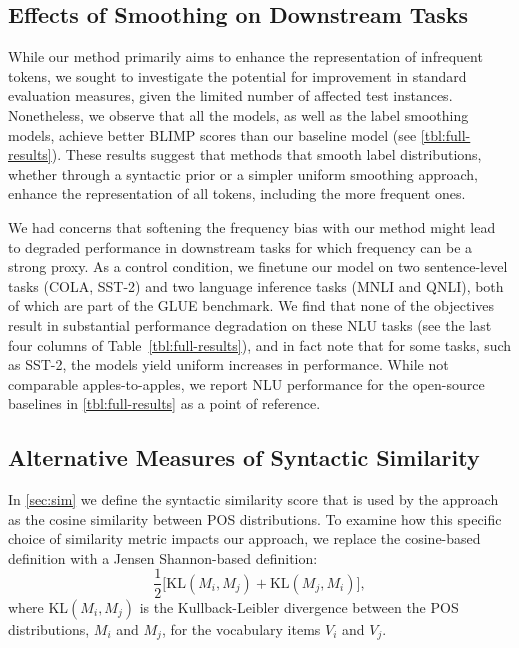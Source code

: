 \subsection{Effects of Smoothing on Downstream Tasks}
While our method primarily aims to enhance the representation of infrequent tokens, we sought to investigate the potential for improvement in standard evaluation measures, given the limited number of affected test instances. Nonetheless, we observe that all the \smoothing models, as well as the label smoothing models, achieve better BLIMP scores than our baseline model (see \cref{tbl:full-results}). These results suggest that methods that smooth label distributions, whether through a syntactic prior or a simpler uniform smoothing approach, enhance the representation of all tokens, including the more frequent ones.

We had concerns that softening the frequency bias with our method might lead to degraded performance in downstream tasks for which frequency can be a strong proxy. As a control condition, we finetune our model on two sentence-level tasks (COLA, SST-2) and two language inference tasks (MNLI and QNLI), both of which are part of the GLUE \citep{wang2018glue} benchmark. We find that none of the \smoothing objectives result in substantial performance degradation on these NLU tasks (see the last four columns of Table~\cref{tbl:full-results}), and in fact note that for some tasks, such as SST-2, the \smoothing models yield uniform increases in performance. While not comparable apples-to-apples, we report NLU performance for the open-source baselines in \cref{tbl:full-results} as a point of reference. 

\subsection{Alternative Measures of Syntactic Similarity}

In \cref{sec:sim} we define the syntactic similarity score that is used by the \smoothing approach as the cosine similarity between POS distributions. To examine how this specific choice of similarity metric impacts our approach, we replace the cosine-based definition with a Jensen Shannon-based definition:
$$ \frac{1}{2}\big[ \text{KL}(M_i, M_j ) + \text{KL}(M_j, M_i)\big],$$
where KL$(M_i, M_j)$ is the Kullback-Leibler divergence between the POS distributions, $M_i$ and $M_j$, for the vocabulary items $V_i$ and $V_j$.

